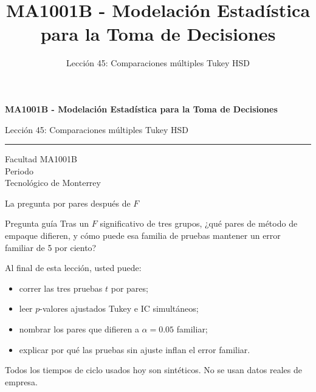 \documentclass[aspectratio=169,10pt,spanish]{beamer}
\title{MA1001B - Modelación Estadística para la Toma de Decisiones}
\subtitle{Lección 45: Comparaciones múltiples Tukey HSD}
\author{}
\institute{Tecnol\'ogico de Monterrey}
\date{}
\begin{document}
\begin{frame}[plain]
  \vspace{1.2cm}
  {\Large\bfseries MA1001B - Modelación Estadística para la Toma de Decisiones\par}
  \vspace{0.7cm}
  {\large Lección 45: Comparaciones múltiples Tukey HSD\par}
  \vspace{0.7cm}
  {\color{TecRojo}\rule{\textwidth}{1.2pt}}
  \vspace{0.8cm}

  Facultad MA1001B\\[0.3cm]
  Periodo\\[0.3cm]
  Tecnol\'ogico de Monterrey
\end{frame}

\begin{frame}{La pregunta por pares después de $F$}
  \begin{alertblock}{Pregunta guía}
    Tras un $F$ significativo de tres grupos, ¿qué pares de método de
    empaque difieren, y cómo puede esa familia de pruebas mantener un error
    familiar de 5 por ciento?
  \end{alertblock}

  \vspace{0.6em}
  Al final de esta lección, usted puede:
  \begin{itemize}
    \item correr las tres pruebas $t$ por pares;
    \item leer $p$-valores ajustados Tukey e IC simultáneos;
    \item nombrar los pares que difieren a $\alpha=0.05$ familiar;
    \item explicar por qué las pruebas sin ajuste inflan el error familiar.
  \end{itemize}

  \vfill
  \scriptsize Todos los tiempos de ciclo usados hoy son sintéticos. No se usan datos reales de empresa.
\end{frame}
\end{document}
